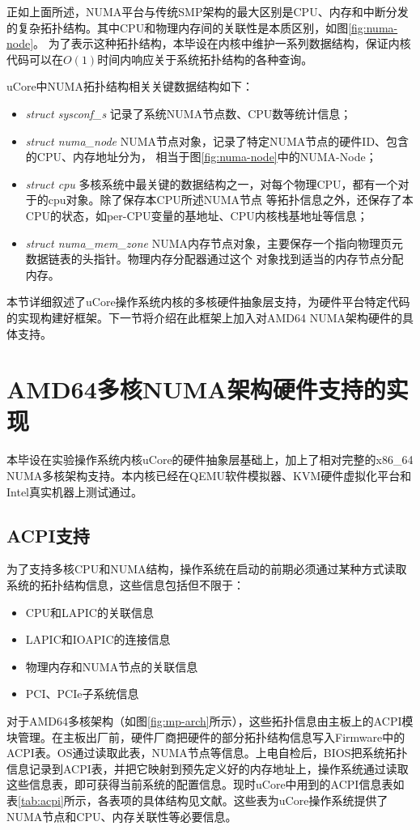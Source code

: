 正如上面所述，NUMA平台与传统SMP架构的最大区别是CPU、内存和中断分发的复杂拓扑结构。其中CPU和物理内存间的关联性是本质区别，如图\ref{fig:numa-node}。
为了表示这种拓扑结构，本毕设在内核中维护一系列数据结构，保证内核代码可以在$O(1)$时间内响应关于系统拓扑结构的各种查询。

uCore中NUMA拓扑结构相关关键数据结构如下：
\begin{itemize}
\item \emph{struct sysconf\_s}  \pozhehao 记录了系统NUMA节点数、CPU数等统计信息；
\item \emph{struct numa\_node} \pozhehao NUMA节点对象，记录了特定NUMA节点的硬件ID、包含的CPU、内存地址分为，
	相当于图\ref{fig:numa-node}中的NUMA-Node；
\item \emph{struct cpu} \pozhehao 多核系统中最关键的数据结构之一，对每个物理CPU，都有一个对于的cpu对象。除了保存本CPU所述NUMA节点
等拓扑信息之外，还保存了本CPU的状态，如per-CPU变量的基地址、CPU内核栈基地址等信息；
\item \emph{struct numa\_mem\_zone} \pozhehao NUMA内存节点对象，主要保存一个指向物理页元数据链表的头指针。物理内存分配器通过这个
对象找到适当的内存节点分配内存。
\end{itemize}

本节详细叙述了uCore操作系统内核的多核硬件抽象层支持，为硬件平台特定代码的实现构建好框架。下一节将介绍在此框架上加入对AMD64 NUMA架构硬件的具体支持。


\section{AMD64多核NUMA架构硬件支持的实现}
本毕设在实验操作系统内核uCore的硬件抽象层基础上，加上了相对完整的x86\_64 NUMA多核架构支持。本内核已经在QEMU软件模拟器、KVM硬件虚拟化平台和Intel真实机器上测试通过。

\subsection{ACPI支持}
为了支持多核CPU和NUMA结构，操作系统在启动的前期必须通过某种方式读取系统的拓扑结构信息，这些信息包括但不限于：
\begin{itemize}
\item CPU和LAPIC的关联信息
\item LAPIC和IOAPIC的连接信息
\item 物理内存和NUMA节点的关联信息
\item PCI、PCIe子系统信息
\end{itemize}

对于AMD64多核架构（如图\ref{fig:mp-arch}所示），这些拓扑信息由主板上的ACPI模块管理。在主板出厂前，硬件厂商把硬件的部分拓扑结构信息写入Firmware中的
	ACPI表。OS通过读取此表，NUMA节点等信息。上电自检后，BIOS把系统拓扑信息记录到ACPI表，并把它映射到预先定义好的内存地址上，操作系统通过读取这些信息表，即可获得当前系统的配置信息。现时uCore中用到的ACPI信息表如表\ref{tab:acpi}所示，各表项的具体结构见文献\cite{acpica}。这些表为uCore操作系统提供了NUMA节点和CPU、内存关联性等必要信息。


